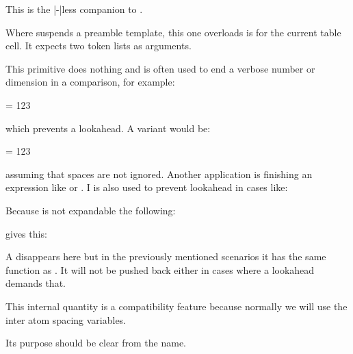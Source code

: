 \startnewprimitive[title={\prm {rdivideby}}]

This is the |-|less companion to .

\stopnewprimitive

\startnewprimitive[title={\prm {realign}}]

Where  suspends a preamble template, this one overloads is for the
current table cell. It expects two token lists as arguments.

\stopnewprimitive

\startoldprimitive[title={\prm {relax}}]

This primitive does nothing and is often used to end a verbose number or
dimension in a comparison, for example:

\starttyping
\ifnum \scratchcounter = 123\relax
\stoptyping

which prevents a lookahead. A variant would be:

\starttyping
\ifnum \scratchcounter = 123 %
\stoptyping

assuming that spaces are not ignored. Another application is finishing
an expression like  or . I is also used
to prevent lookahead in cases like:

\starttyping
\vrule height 3pt depth 2pt width 5pt\relax
{}\relax
\stoptyping

Because  is not expandable the following:

\startbuffer
\edef\foo{\relax}   \meaningfull\foo
\edef\oof{\norelax} \meaningfull\oof
\stopbuffer

\typebuffer

gives this:

\startlines
\getbuffer
\stoplines

A  disappears here but in the previously mentioned scenarios
it has the same function as . It will not be pushed back either
in cases where a lookahead demands that.

\stopoldprimitive

\startoldprimitive[title={\prm {relpenalty}}]

This internal quantity is a compatibility feature because normally we will use
the inter atom spacing variables.

\stopoldprimitive

\startnewprimitive[title={\prm {resetlocalboxes}}]

Its purpose should be clear from the name.

